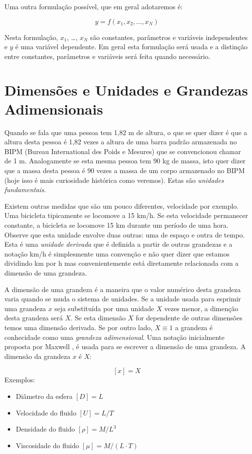 Uma outra formulação possível, que em geral adotaremos é:

\[
y = f(x_1, x_2, \ldots, x_N)
\]

Nesta formulação, $x_1$, \ldots, $x_N$ são constantes, parâmetros e variáveis independentes e $y$ é uma variável dependente. Em geral esta formulação será usada e a distinção entre constantes, parâmetros e variáveis será feita quando necessário.



\section{Dimensões e Unidades e Grandezas Adimensionais}

Quando se fala que uma pessoa tem 1,82 m de altura, o que se quer dizer é que a altura desta pessoa é 1,82 vezes a altura de uma barra padrão armazenada no BIPM (Bureau International des Poids e Mesures) que se convencionou chamar de 1 m. Analogamente se esta mesma pessoa tem 90 kg de massa, isto quer dizer que a massa desta pessoa é 90 vezes a massa de um corpo armazenado no BIPM (hoje isso é mais curiosidade histórica como veremos). Estas são \emph{unidades fundamentais}. 

Existem outras medidas que são um pouco diferentes, velocidade por exemplo. Uma bicicleta tipicamente se locomove a 15 km/h. Se esta velocidade permanecer constante, a bicicleta se locomove 15 km durante um período de uma hora. Observe que esta unidade envolve duas outras: uma de espaço e outra de tempo. Esta é uma \emph{unidade derivada} que é definida a partir de outras grandezas e a notação km/h é simplesmente uma convenção e não quer dizer que estamos dividindo km por h mas convenientemente está diretamente relacionada com a dimensão de uma grandeza.

A dimensão de uma grandeza é a maneira que o valor numérico desta grandeza varia quando se muda o sistema de unidades. Se a unidade usada para esprimir uma grandeza $x$ seja substituída por uma unidade $X$ vezes menor, a dimenção desta grandeza será $X$. Se esta dimensão $X$ for dependente de outras dimensões temos uma dimensão derivada. Se por outro lado, $X\equiv 1$ a grandeza é conhecidade como uma \emph{grandeza adimensional}. Uma notação inicialmente proposta por Maxwell \cite{Maxwell1871}, é usada para se escrever a dimensão de uma grandeza. A dimensão da grandeza $x$ é $X$:

\[
  [x] = X
\]
Exemplos:
\begin{itemize}
\item Diâmetro da esfera $[D] = L$
\item Velocidade do fluido $[U] = L/T$
\item Densidade do fluido $[\rho] = M / L^3$
\item Viscosidade do fluido $[\mu] = M / (L\cdot T)$
\end{itemize}

